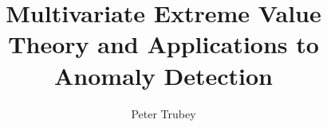 \documentclass{article}
\title{Multivariate Extreme Value Theory and Applications to Anomaly Detection}
\author{Peter Trubey}
\date{}
\begin{document}
\maketitle
\thispagestyle{empty}
\begin{abstract}
  
\end{abstract}

\newpage

\tableofcontents
\thispagestyle{empty}

\newpage

\clearpage
{}



















\newpage



\end{document}
